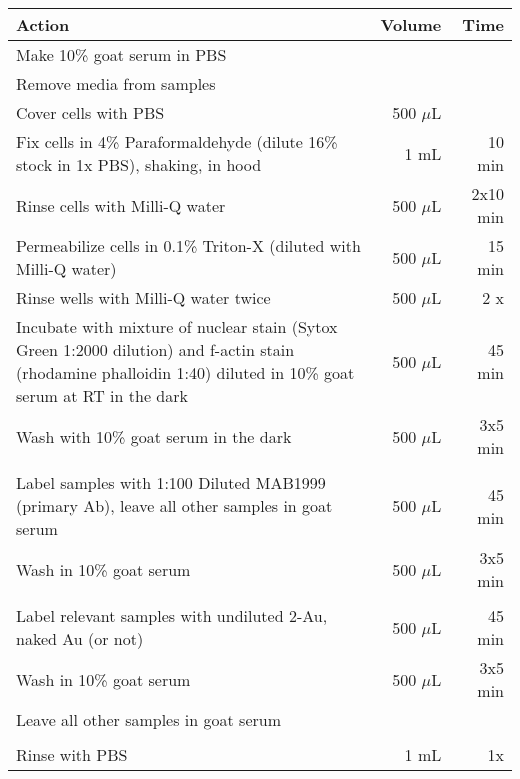 \begin{table}[htbp]
\begin{minipage}{\linewidth}
\setlength{\tymax}{0.5\linewidth}
\centering
\small
\begin{tabular}{p{4in}rr} \toprule
Action&Volume&Time\\
\midrule
Make 10\% goat serum in PBS&&\\
Remove media from samples&&\\
Cover cells with PBS&500 $\mu$L&\\
Fix cells in 4\% Paraformaldehyde (dilute 16\% stock in 1x PBS), shaking, in hood&1 mL&10 min\\
Rinse cells with Milli-Q water&500 $\mu$L&2x10 min\\
Permeabilize cells in 0.1\% Triton-X (diluted with Milli-Q water) &500 $\mu$L&15 min\\
Rinse wells with Milli-Q water twice&500 $\mu$L&2 x\\
Incubate with mixture of nuclear stain (Sytox Green 1:2000 dilution)  \linebreak  and f-actin stain (rhodamine phalloidin 1:40) diluted in 10\% goat serum at RT in the dark&500 $\mu$L&45 min\\
Wash with 10\% goat serum in the dark&500 $\mu$L&3x5 min\\
&&\\
Label samples with 1:100 Diluted MAB1999 (primary Ab), leave all other samples in goat serum&500 $\mu$L&45 min\\
Wash in 10\% goat serum&500 $\mu$L&3x5 min\\
&&\\
Label relevant samples with undiluted 2-Au, naked Au (or not)&500 $\mu$L&45 min\\
Wash in 10\% goat serum&500 $\mu$L&3x5 min\\
Leave all other samples in goat serum&&\\
&&\\
Rinse with PBS&1 mL&1x\\

\bottomrule

\end{tabular}
\end{minipage}
\end{table}

